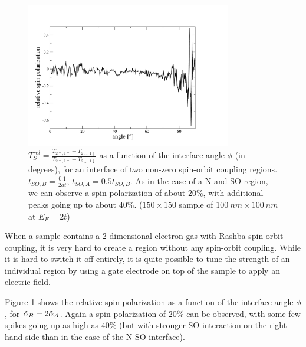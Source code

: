 \begin{figure}[htb]
    \begin{center}
        \includegraphics[width=0.8\textwidth]{relative-polarization-so-so.pdf}
    \end{center}
    \caption{$T_S^{rel} = \frac{T_{2\uparrow,1\uparrow} - T_{2\downarrow,1\downarrow}}
        {T_{2\uparrow,1\uparrow} + T_{2\downarrow,1\downarrow}}$ as
        a function of the interface angle $\phi$ (in degrees), for an
        interface of two non-zero spin-orbit coupling regions. $t_{SO,B} =
        \frac{0.1}{2 a t}$, $t_{SO,A} = 0.5 t_{SO,B}$. As in the case of
        a N and SO region, we can observe a spin polarization of about $20\%$,
          with additional peaks going up to about $40\%$.
        ($150 \times 150$ sample of $100~nm \times 100~nm$ at $E_F = 2 t$)
        }
    \label{fig:n-so-rel}
\end{figure}

When a sample contains a 2-dimensional electron gas with Rashba spin-orbit
coupling, it is very hard to create a region without any spin-orbit coupling.
While it is hard to switch it off entirely, it is quite possible to tune the
strength of an individual region by using a gate electrode on top of the
sample to apply an electric field.

Figure \ref{fig:n-so-rel} shows the relative spin polarization as a function
of the interface angle $\phi$, for $\tilde \alpha_B = 2 \tilde \alpha_A$. Again a spin
polarization of $20\%$ can be observed, with some few spikes going up as high
as $40\%$ (but with stronger SO interaction on the right-hand side than in the
case of the N-SO interface).

